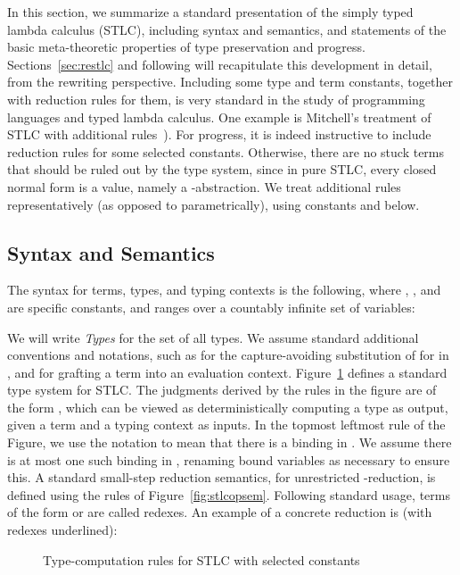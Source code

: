 \documentclass{LMCS}
\begin{document}
In this section, we summarize a standard presentation of the simply
typed lambda calculus (STLC), including syntax and semantics, and statements
of the basic meta-theoretic properties of type preservation and
progress.  Sections~\ref{sec:restlc} and following will recapitulate
this development in detail, from the rewriting perspective.  Including
some type and term constants, together with reduction rules for them,
is very standard in the study of programming languages and typed
lambda calculus.  One example is Mitchell's treatment of STLC with
additional rules~\cite[Section 4.4.3]{M96}).  For progress, it is
indeed instructive to include reduction rules for some selected
constants.  Otherwise, there are no stuck terms that should be ruled
out by the type system, since in pure STLC, every closed normal form
is a value, namely a -abstraction.  We treat additional rules
representatively (as opposed to parametrically), using constants 
and  below.

\subsection{Syntax and Semantics}
\label{sec:stlcstand}

The syntax for terms, types, and typing contexts is the following,
where , , and  are specific constants, and  ranges over a
countably infinite set of variables:

\noindent We will write \textit{Types} for the set of all types.  We
assume standard additional conventions and notations, such as
 for the capture-avoiding substitution of  for  in
, and  for grafting a term into an evaluation context.
Figure~\ref{fig:stlc} defines a standard type system for STLC.  The
judgments derived by the rules in the figure are of the form
, which can be viewed as deterministically computing
a type  as output, given a term  and a typing context 
as inputs.  In the topmost leftmost rule of the Figure, we use the
notation  to mean that there is a binding  in
.  We assume there is at most one such binding in ,
renaming bound variables as necessary to ensure this.  A standard
small-step reduction semantics, for unrestricted -reduction, is
defined using the rules of Figure~\ref{fig:stlcopsem}.  Following
standard usage, terms of the form  or  are
called redexes.  An example of a concrete reduction is (with redexes
underlined):



\begin{figure}

\caption{Type-computation rules for STLC with selected constants}
\label{fig:stlc}
\end{figure}
\end{document}
